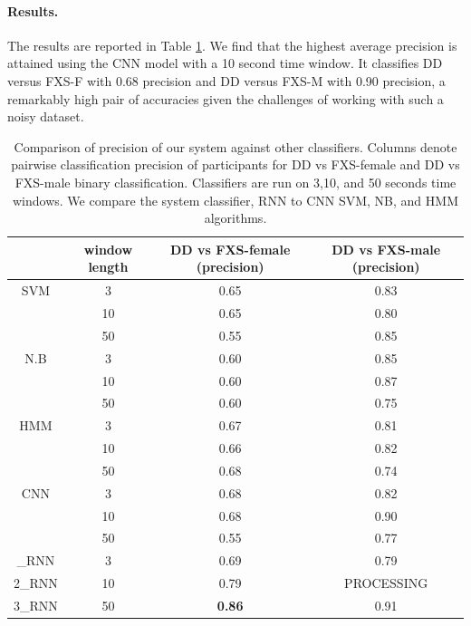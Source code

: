\documentclass{llncs}
\begin{document}
  \vspace*{-\baselineskip}
  \paragraph{Results.} The results are reported in Table  \ref{table:profiler}. We find that the highest average precision is attained using the CNN model with a 10 second time window. It classifies DD versus FXS-F with 0.68 precision and DD versus FXS-M with 0.90 precision, a remarkably high pair of accuracies given the challenges of working with such a noisy dataset.

  \begin{table}[t]
    \centering
    \begin{tabular}{c|c|c|c}
      & window length & DD vs FXS-female (precision) & DD vs FXS-male (precision)\\
      \hline
      SVM  & 3   & 0.65 & 0.83\\
      & 10 & 0.65 & 0.80 \\
      & 50 & 0.55 & 0.85 \\

      \hline
      N.B   & 3  & 0.60 & 0.85\\
      & 10 & 0.60 & 0.87\\
      & 50 & 0.60 & 0.75\\

      \hline
      HMM & 3  & 0.67 & 0.81\\
      & 10 & 0.66 & 0.82\\
      & 50 & 0.68 & 0.74\\

      \hline
      CNN & 3 & 0.68 & 0.82 \\
      & 10 & 0.68 & 0.90\\
      & 50 & 0.55 & 0.77\\
      \Xhline{4\arrayrulewidth}
      \hline
      1\_RNN  & 3 &  0.69 & 0.79 \\
      2\_RNN  & 10 &   0.79 & PROCESSING\\
      3\_RNN  &  50 & {\bf 0.86} & 0.91\\
    \end{tabular}

    \caption{Comparison of precision of our system against other classifiers. Columns denote pairwise classification precision of participants for DD vs FXS-female and DD vs FXS-male binary classification. Classifiers are run on 3,10, and 50 seconds time windows. We compare the system classifier, RNN to CNN SVM, NB, and HMM algorithms.}
    \label{table:profiler}
  \end{table}
\end{document}
